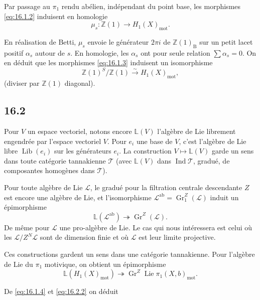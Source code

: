\documentclass[12pt,a4paper]{article}
\theoremstyle{plain}
\theoremstyle{definition}
\theoremstyle{remark}
\DeclareMathOperator{\Gr}{Gr}
\DeclareMathOperator{\Lib}{Lib}
\DeclareMathOperator{\Lie}{Lie}
\newcommand{\bZ}{\mathbb{Z}}
\newcommand{\LL}{\mathbb{L}}
\DeclareMathOperator{\Ind}{Ind}
\newcommand{\B}{\mathrm{B}}
\newcommand{\mot}{\mathrm{mot}}
\begin{document}
Par passage au $\pi_1$ rendu abélien, indépendant du point base, les morphismes \eqref{eq:16.1.2} induisent en homologie
\begin{equation}\label{eq:16.1.3}
\mu_s: \bZ(1) \to H_1(X)_{\mot}.
\end{equation}

En réalisation de Betti, $\mu_s$ envoie le générateur $2\pi i$ de $\bZ(1)_{\B}$ sur un petit lacet positif $\alpha_s$ autour de $s$. En homologie, les $\alpha_s$ ont pour seule relation $\sum \alpha_s = 0$. On en déduit que les morphismes \eqref{eq:16.1.3} induisent un isomorphisme
\begin{equation}\label{eq:16.1.4}
\bZ(1)^S / \bZ(1) \xrightarrow{\sim} H_1(X)_{\mot},
\end{equation}
(diviser par $\bZ(1)$ diagonal).

\subsection*{16.2}

Pour $V$ un espace vectoriel, notons encore $\LL(V)$ l'algèbre de Lie librement engendrée par l'espace vectoriel $V$. Pour $e_i$ une base de $V$, c'est l'algèbre de Lie libre $\Lib(e_i)$ sur les générateurs $e_i$. La construction $V \mapsto \LL(V)$ garde un sens dans toute catégorie tannakienne $\mathcal{T}$ (avec $\LL(V)$ dans $\Ind \mathcal{T}$, gradué, de composantes homogènes dans $\mathcal{T}$).

Pour toute algèbre de Lie $\mathcal{L}$, le gradué pour la filtration centrale descendante $Z$ est encore une algèbre de Lie, et l'isomorphisme $\mathcal{L}^{\text{ab}} = \Gr_1^Z(\mathcal{L})$ induit un épimorphisme
\begin{equation}\label{eq:16.2.1}
\LL(\mathcal{L}^{\text{ab}}) \twoheadrightarrow \Gr^Z(\mathcal{L}).
\end{equation}
De même pour $\mathcal{L}$ une pro-algèbre de Lie. Le cas qui nous intéressera est celui où les $\mathcal{L}/Z^N \mathcal{L}$ sont de dimension finie et où $\mathcal{L}$ est leur limite projective.

Ces constructions gardent un sens dans une catégorie tannakienne. Pour l'algèbre de Lie du $\pi_1$ motivique, on obtient un épimorphisme
\begin{equation}\label{eq:16.2.2}
\LL(H_1(X)_{\mot}) \twoheadrightarrow \Gr^Z \Lie \pi_1(X, b)_{\mot}.
\end{equation}

De \eqref{eq:16.1.4} et \eqref{eq:16.2.2} on déduit
\end{document}

